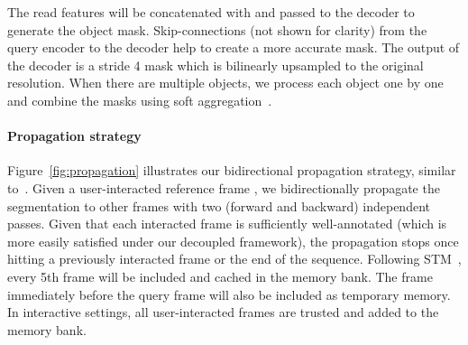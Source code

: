 \documentclass[final]{cvpr}
\begin{document}
	The read features will be concatenated with  and passed to the decoder to generate the object mask. Skip-connections (not shown for clarity) from the query encoder to the decoder help to create a more accurate mask. 
	The output of the decoder is a stride 4 mask which is bilinearly upsampled to the original resolution. When there are multiple objects, we process each object one by one and combine the masks using soft aggregation~\cite{oh2019videoSTM}.
	\vspace{-0.05in}	
	\paragraph{Propagation strategy}
	\vspace{-0.05in}	
	Figure~\ref{fig:propagation} illustrates our bidirectional propagation strategy, similar to~\cite{oh2019fastInteractive}. Given a user-interacted reference frame , we bidirectionally propagate the segmentation to other frames with two (forward and backward) independent passes.
	Given that each interacted frame is sufficiently well-annotated (which is more easily satisfied under our decoupled framework), the propagation stops once hitting a previously interacted frame or the end of the sequence. Following STM~\cite{oh2019videoSTM}, every 5th frame will be included and cached in the memory bank.
	The frame immediately before the query frame will also be included as temporary memory.
	In interactive settings, all user-interacted frames are trusted and added to the memory bank.
	
\end{document}
